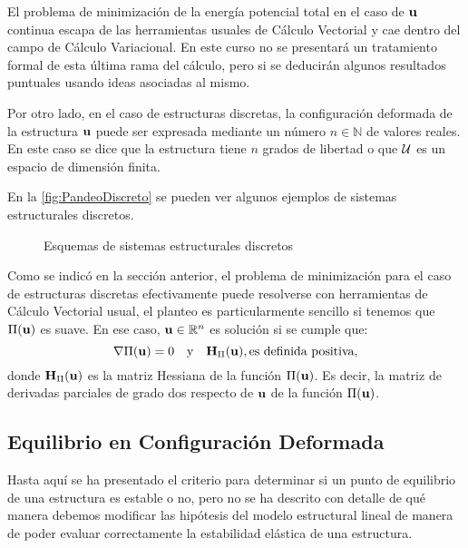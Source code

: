 El problema de minimización de la energía potencial total en el caso de ${\bf u}$ continua escapa de las herramientas usuales de Cálculo Vectorial y cae dentro del campo de Cálculo Variacional. En este curso no se presentará un tratamiento formal de esta última rama del cálculo, pero si se deducirán algunos resultados puntuales usando ideas asociadas al mismo.

Por otro lado, en el caso de estructuras discretas, la configuración deformada de la estructura ${\bf u}$ puede ser expresada mediante un número $n\in\mathbb{N}$ de valores reales. En este caso se dice que la estructura tiene $n$ grados de libertad o que ${\mathcal U}$ es un espacio de dimensión finita.

En la \autoref{fig:PandeoDiscreto} se pueden ver algunos ejemplos de sistemas estructurales discretos.

\begin{figure}[htb]
	\centering
{}
\hspace{6em}
\caption{Esquemas de sistemas estructurales discretos}
	\label{fig:PandeoDiscreto}
\end{figure}

Como se indicó en la sección anterior, el problema de minimización para el caso de estructuras discretas efectivamente puede resolverse con herramientas de Cálculo Vectorial usual, el planteo es particularmente sencillo si tenemos que $\Pi({\bf u})$ es suave. En ese caso, ${\bf u} \in \mathbb{R}^n$ es solución si se cumple que:
%
$$\nabla \Pi({\bf u})=0 \quad \text{y} \quad  {\bf H}_\Pi ({\bf u}), \text{es definida positiva},$$
%
donde ${\bf H}_\Pi({\bf u})$ es la matriz Hessiana de la función $\Pi({\bf u})$. Es decir, la matriz de derivadas parciales de grado dos respecto de ${\bf u}$ de la función $\Pi({\bf u})$.


\subsection{Equilibrio en Configuración Deformada}

Hasta aquí se ha presentado el criterio para determinar si un punto de equilibrio de una estructura es estable o no, pero no se ha descrito con detalle de qué manera debemos modificar las hipótesis del modelo estructural lineal de manera de poder evaluar correctamente la estabilidad elástica de una estructura.

